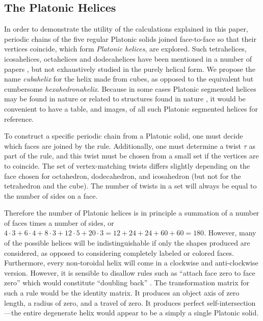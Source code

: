 \documentclass[mathematics,article,submit,pdftex,moreauthors]{Definitions/mdpi}
\begin{document}
\subsection{The Platonic Helices}

\label{sec:platonic}

In order to demonstrate the utility of the calculations explained in this paper,
periodic chains of the five regular Platonic solids joined face-to-face so that their vertices coincide,
which form {\em Platonic helices}, are explored.
Such tetrahelices, icosahelices, octahelices and dodecahelices
have been mentioned in a number of papers \cite{elgersma2016quadrahelix,elgersma2017asymptotically,babiker2012combinatorial,lord2001sphere}, but not exhaustively studied in
the purely helical form.
We propose the name {\em cubahelix} for the helix made from cubes, as opposed to the equivalent
but cumbersome {\em hexahedronahelix}.
Because in some cases Platonic segmented helices may be found in nature or
related to structures found in nature \cite{lord2004gamma,pearce1990structure},
it would be convenient to have a table, and images, of all such Platonic segmented helices for reference.

To construct a specific periodic chain from a Platonic solid,
one must decide which faces are joined by the rule.
Additionally, one must determine a twist
$\tau$ as part of the rule, and this twist must be chosen from a small set if the vertices are to coincide.
The set of vertex-matching twists differs slightly depending on the face chosen for octahedron, dodecahedron, and icosahedron
(but not for the tetrahedron and the cube). The number of twists in a set will always be equal to the number of sides on a face.

Therefore the number of Platonic helices is in principle a summation of a number of faces times a number of sides, or
$4 \cdot 3 + 6 \cdot 4 + 8 \cdot 3 + 12 \cdot 5 + 20 \cdot 3 = 12 + 24 + 24 + 60 + 60 = 180$.
However, many of the possible helices will be indistinguishable if only the shapes produced are considered,
as opposed to considering completely labeled or colored faces.
Furthermore, every non-toroidal helix will come in a clockwise and anti-clockwise version.
However, it is sensible to disallow rules such as ``attach face zero to face zero''
which would constitute
``doubling back'' \cite{elgersma2016quadrahelix,elgersma2017asymptotically}.
The transformation matrix for such a rule would be the identity matrix.
It produces an object axis of zero length, a radius of zero, and
a travel of zero. It produces perfect self-intersection---the entire
degenerate helix would appear to be a simply a single Platonic solid.
\end{document}
